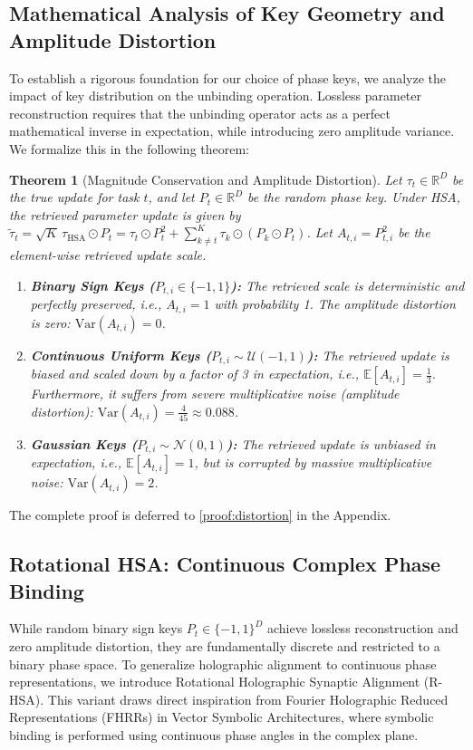\documentclass{article}
\theoremstyle{plain}
\newtheorem{theorem}{Theorem}[section]
\theoremstyle{definition}
\theoremstyle{remark}
\begin{document}
\subsection{Mathematical Analysis of Key Geometry and Amplitude Distortion}
\label{subsec:key_geometry}
To establish a rigorous foundation for our choice of phase keys, we analyze the impact of key distribution on the unbinding operation. Lossless parameter reconstruction requires that the unbinding operator acts as a perfect mathematical inverse in expectation, while introducing zero amplitude variance. We formalize this in the following theorem:

\begin{theorem}[Magnitude Conservation and Amplitude Distortion]
Let $\tau_t \in \mathbb{R}^D$ be the true update for task $t$, and let $P_t \in \mathbb{R}^D$ be the random phase key. Under HSA, the retrieved parameter update is given by $\tilde{\tau}_t = \sqrt{K} \, \tau_\text{HSA} \odot P_t = \tau_t \odot P_t^2 + \sum_{k \neq t}^K \tau_k \odot (P_k \odot P_t)$. Let $A_{t,i} = P_{t,i}^2$ be the element-wise retrieved update scale.
\begin{enumerate}
    \item \textbf{Binary Sign Keys ($P_{t,i} \in \{-1, 1\}$):} The retrieved scale is deterministic and perfectly preserved, i.e., $A_{t,i} = 1$ with probability 1. The amplitude distortion is zero: $\text{Var}(A_{t,i}) = 0$.
    \item \textbf{Continuous Uniform Keys ($P_{t,i} \sim \mathcal{U}(-1, 1)$):} The retrieved update is biased and scaled down by a factor of 3 in expectation, i.e., $\mathbb{E}[A_{t,i}] = \frac{1}{3}$. Furthermore, it suffers from severe multiplicative noise (amplitude distortion): $\text{Var}(A_{t,i}) = \frac{4}{45} \approx 0.088$.
    \item \textbf{Gaussian Keys ($P_{t,i} \sim \mathcal{N}(0, 1)$):} The retrieved update is unbiased in expectation, i.e., $\mathbb{E}[A_{t,i}] = 1$, but is corrupted by massive multiplicative noise: $\text{Var}(A_{t,i}) = 2$.
\end{enumerate}
\end{theorem}
The complete proof is deferred to \cref{proof:distortion} in the Appendix.

\subsection{Rotational HSA: Continuous Complex Phase Binding}
\label{subsec:rotational_hsa}
While random binary sign keys $P_t \in \{-1, 1\}^D$ achieve lossless reconstruction and zero amplitude distortion, they are fundamentally discrete and restricted to a binary phase space. To generalize holographic alignment to continuous phase representations, we introduce Rotational Holographic Synaptic Alignment (R-HSA). This variant draws direct inspiration from Fourier Holographic Reduced Representations (FHRRs) in Vector Symbolic Architectures, where symbolic binding is performed using continuous phase angles in the complex plane.
\end{document}
